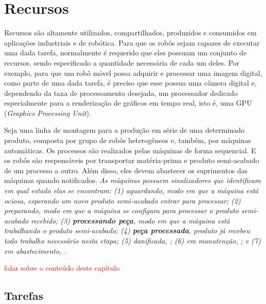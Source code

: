 \chapter[Recursos]{Recursos} \label{cap:recursos}

    Recursos são altamente utilizados, compartilhados, produzidos e consumidos em aplicações industriais e de robótica. Para que os robôs sejam capazes de executar uma dada tarefa, normalmente é requerido que eles possuam um conjunto de recursos, sendo especificado a quantidade necessária de cada um deles. Por exemplo, para que um robô móvel possa adquirir e processar uma imagem digital, como parte de uma dada tarefa, é preciso que esse possua uma câmera digital e, dependendo da taxa de processamento desejada, um processador dedicado especialmente para a renderização de gráficos em tempo real, isto é, uma GPU (\textit{Graphics Processing Unit}).
    
    Seja uma linha de montagem para a produção em série de uma determinado produto, composta por grupo de robôs heterogêneos e, também, por máquinas automáticas. Os processos são realizados pelas máquinas de forma sequencial. E os robôs são responsáveis por transportar matéria-prima e produto semi-acabado de um processo a outro. Além disso, eles devem abastecer os suprimentos das máquinas quando notificados. \emph{\color{red} As máquinas possuem sinalizadores que identificam em qual estado elas se encontram: (1) \textit{aguardando}, modo em que a máquina está ociosa, esperando um novo produto semi-acabado entrar para processar; (2) \textit{preparando}, modo em que a máquina se configura para processar o produto semi-acabado recebido; (3) \textit{\textbf{processando peça}}, modo em que a máquina está trabalhando o produto semi-acabado; (4) \textit{\textbf{peça processada}}, produto já recebeu todo trabalho necessário nesta etapa; (5) \textit{danificada}, ; (6) \textit{em manutenção}, ; e (7) \textit{em abastecimento}, .}
    
    \textcolor{red}{falar sobre o conteúdo deste capítulo}
    
    \section{Tarefas} \label{sec:tarefa}
        
